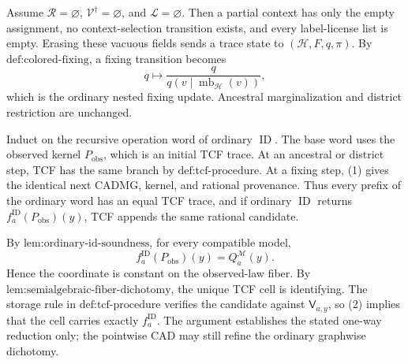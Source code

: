 Assume \(\mathcal R=\varnothing\), \(\mathcal V^{\dagger}=\varnothing\), and \(\mathcal L=\varnothing\). Then a partial context has only the empty assignment, no context-selection transition exists, and every label-license list is empty. Erasing these vacuous fields sends a trace state to \((\mathcal H,F,q,\pi)\). By \(\text{def:colored-fixing}\), a fixing transition becomes
\[
q\longmapsto
\frac{q}{q(v\mid\operatorname{mb}_{\mathcal H}(v))},
\tag{1}
\]
which is the ordinary nested fixing update. Ancestral marginalization and district restriction are unchanged.

Induct on the recursive operation word of ordinary \(\operatorname{ID}\). The base word uses the observed kernel \(P_{\mathrm{obs}}\), which is an initial TCF trace. At an ancestral or district step, TCF has the same branch by \(\text{def:tcf-procedure}\). At a fixing step, (1) gives the identical next CADMG, kernel, and rational provenance. Thus every prefix of the ordinary word has an equal TCF trace, and if ordinary \(\operatorname{ID}\) returns \(f_a^{\mathrm{ID}}(P_{\mathrm{obs}})(y)\), TCF appends the same rational candidate.

By \(\text{lem:ordinary-id-soundness}\), for every compatible model,
\[
f_a^{\mathrm{ID}}(P_{\mathrm{obs}})(y)=Q_a^{\mathcal M}(y).
\tag{2}
\]
Hence the coordinate is constant on the observed-law fiber. By \(\text{lem:semialgebraic-fiber-dichotomy}\), the unique TCF cell is identifying. The storage rule in \(\text{def:tcf-procedure}\) verifies the candidate against \(\mathsf V_{a,y}\), so (2) implies that the cell carries exactly \(f_a^{\mathrm{ID}}\). The argument establishes the stated one-way reduction only; the pointwise CAD may still refine the ordinary graphwise dichotomy.